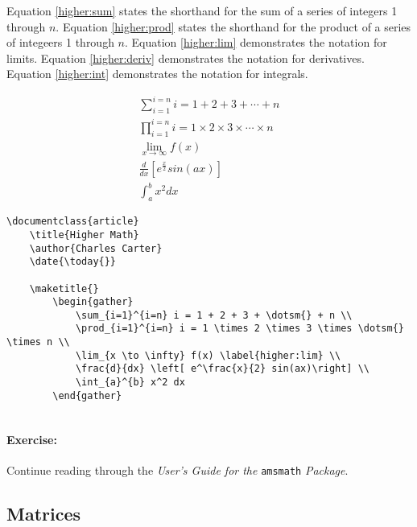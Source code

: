 		Equation \ref{higher:sum} states the shorthand for the sum of a series of integers 1 through $n$. Equation \ref{higher:prod} states the shorthand for the product of a series of integeers 1 through $n$. Equation \ref{higher:lim} demonstrates the notation for limits. Equation \ref{higher:deriv} demonstrates the notation for derivatives. Equation \ref{higher:int} demonstrates the notation for integrals.

		\begin{gather}
			\sum_{i=1}^{i=n} i = 1 + 2 + 3 + \dotsm{} + n \label{higher:sum} \\
			\prod_{i=1}^{i=n} i = 1 \times 2 \times 3 \times \dotsm{} \times n \label{higher:prod} \\
			\lim_{x \to \infty} f(x) \label{higher:lim} \\
			\frac{d}{dx} \left[ e^\frac{x}{2} sin(ax)\right] \label{higher:deriv} \\
			\int_{a}^{b} x^2 dx \label{higher:int}
		\end{gather}
		

        \begin{verbatim}
\documentclass{article}
    \title{Higher Math}
    \author{Charles Carter}
    \date{\today{}}
 
    \maketitle{}
		\begin{gather}
			\sum_{i=1}^{i=n} i = 1 + 2 + 3 + \dotsm{} + n \\
			\prod_{i=1}^{i=n} i = 1 \times 2 \times 3 \times \dotsm{} \times n \\
			\lim_{x \to \infty} f(x) \label{higher:lim} \\
			\frac{d}{dx} \left[ e^\frac{x}{2} sin(ax)\right] \\
			\int_{a}^{b} x^2 dx
		\end{gather}
    
        \end{verbatim}

		\paragraph{Exercise:}Continue reading through the \textit{User's Guide for the }\texttt{amsmath} \textit{Package}.

        \subsection{Matrices}
        \label{Matrices}
        
